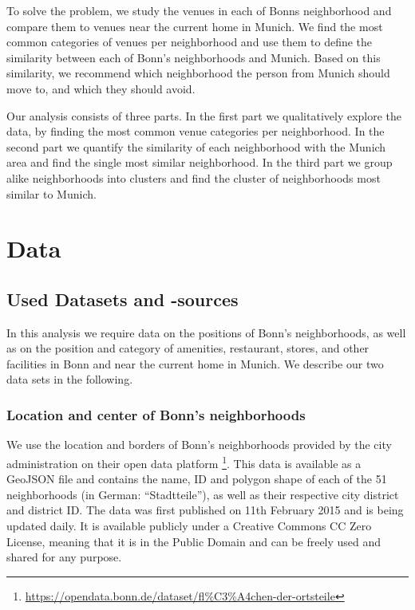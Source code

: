 \documentclass[UKenglish]{scrreprt}
\begin{document}
To solve the problem, we study the venues in each of Bonns neighborhood and compare them to venues near the current home in Munich. We find the most common categories of venues per neighborhood and use them to define the similarity between each of Bonn's neighborhoods and Munich. Based on this similarity, we recommend which neighborhood the person from Munich should move to, and which they should avoid.

Our analysis consists of three parts. In the first part we qualitatively explore the data, by finding the most common venue categories per neighborhood. In the second part we quantify the similarity of each neighborhood with the Munich area and find the single most similar neighborhood. In the third part we group alike neighborhoods into clusters and find the cluster of neighborhoods most similar to Munich.
%
%

\chapter{Data}
\label{sec:Data}

\section{Used Datasets and -sources}
In this analysis we require data on the positions of Bonn's neighborhoods, as well as on the position and category of amenities, restaurant, stores, and other facilities in Bonn and near the current home in Munich. We describe our two data sets in the following.

\subsection{Location and center of Bonn's neighborhoods}
We use the location and borders of Bonn's neighborhoods provided by the city administration on their open data platform \footnote{\href{https://opendata.bonn.de/dataset/fl\%C3\%A4chen-der-ortsteile}{https://opendata.bonn.de/dataset/fl\%C3\%A4chen-der-ortsteile}}\cite{Ortsteile}. This data is available as a GeoJSON file and contains the name, ID and polygon shape of each of the 51 neighborhoods (in German: \enquote{Stadtteile}), as well as their respective city district and district ID.
The data was first published on 11th February 2015 and is being updated daily. It is available publicly under a Creative Commons CC Zero License, meaning that 
it is in the Public Domain and can be freely used and shared for any purpose.
\end{document}
